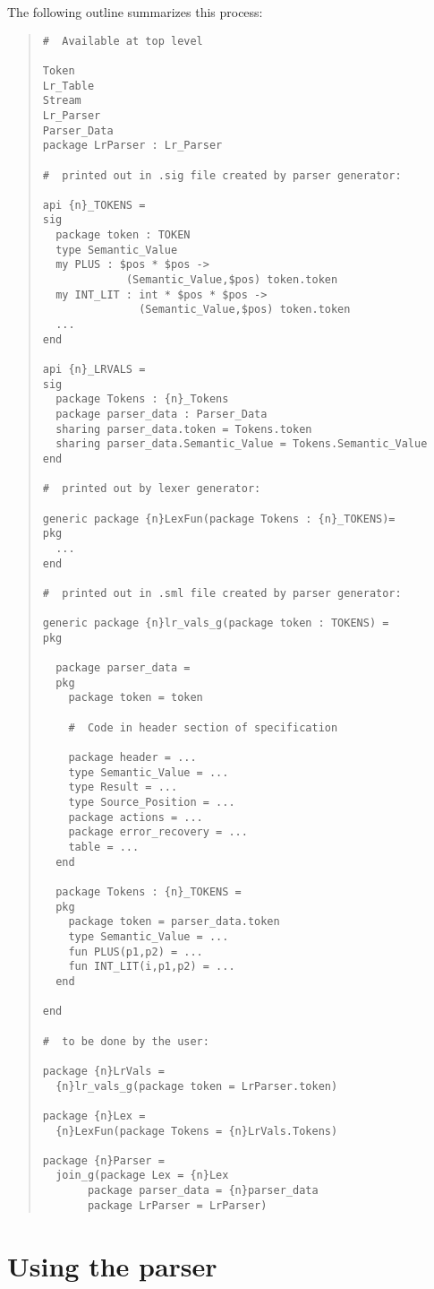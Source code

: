 The following outline summarizes this process:
\begin{quote}
\begin{verbatim}
#  Available at top level 

Token
Lr_Table
Stream
Lr_Parser
Parser_Data
package LrParser : Lr_Parser

#  printed out in .sig file created by parser generator: 

api {n}_TOKENS = 
sig
  package token : TOKEN
  type Semantic_Value
  my PLUS : $pos * $pos ->
             (Semantic_Value,$pos) token.token
  my INT_LIT : int * $pos * $pos ->
               (Semantic_Value,$pos) token.token
  ...
end

api {n}_LRVALS =
sig
  package Tokens : {n}_Tokens
  package parser_data : Parser_Data
  sharing parser_data.token = Tokens.token
  sharing parser_data.Semantic_Value = Tokens.Semantic_Value
end

#  printed out by lexer generator: 

generic package {n}LexFun(package Tokens : {n}_TOKENS)=
pkg
  ...
end

#  printed out in .sml file created by parser generator: 

generic package {n}lr_vals_g(package token : TOKENS) =
pkg

  package parser_data =
  pkg
    package token = token

    #  Code in header section of specification 

    package header = ...
    type Semantic_Value = ...
    type Result = ...
    type Source_Position = ...
    package actions = ...
    package error_recovery = ...
    table = ...
  end

  package Tokens : {n}_TOKENS =
  pkg
    package token = parser_data.token
    type Semantic_Value = ...
    fun PLUS(p1,p2) = ...
    fun INT_LIT(i,p1,p2) = ... 
  end

end

#  to be done by the user: 
 
package {n}LrVals =
  {n}lr_vals_g(package token = LrParser.token)

package {n}Lex = 
  {n}LexFun(package Tokens = {n}LrVals.Tokens)

package {n}Parser =
  join_g(package Lex = {n}Lex
       package parser_data = {n}parser_data
       package LrParser = LrParser)
\end{verbatim}
\end{quote}

\section{Using the parser}
